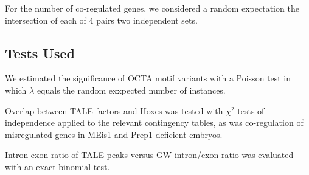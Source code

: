 For the number of co-regulated genes, we considered a random expectation the intersection of each of 4 pairs two independent sets. 

\subsection{Tests Used}

We estimated the significance of OCTA motif variants with a Poisson test in which $\lambda$ equals the random exxpected number of instances.

Overlap between \ac{TALE} factors and Hoxes was tested with $\chi^2$ tests of independence applied to the relevant contingency tables, as was co-regulation of misregulated genes in MEis1 and Prep1 deficient embryos.

Intron-exon ratio of \ac{TALE} peaks versus \ac{GW} intron/exon ratio was evaluated with an exact binomial test.
